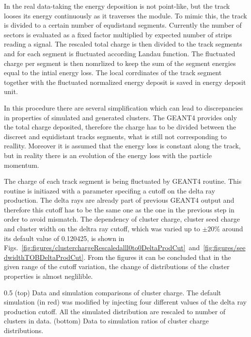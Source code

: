 In the real data-taking the energy deposition is not point-like, but the track looses its energy continuously as it traverses the module. To mimic this, the track is divided to a certain number of equdistand segments. Currently the number of sectors is evaluated as a fixed factor multiplied by expected number of strips reading a signal. The rescaled total charge is then divided to the track segments and for each segment is fluctuated according Landau function. The fluctuated charge per segment is then nomrlized to keep the sum of the segment energies equal to the intial energy loss. The local corrdinates of the track segment together with the fluctuated normalized energy deposit is saved in energy deposit unit.

In this procedure there are several simplification which can lead to discrepancies in properties of simulated and generated clusters. The GEANT4 provides only the total charge deposited, therefore the charge has to be divided between the discreet and equidistant tracks segments, what is still not corresponding to reallity. Moreover it is assumed that the energy loss is constant along the track, but in reality there is an evolution of the energy loss with the particle momentum.

The charge of each track segment is being fluctuated by GEANT4 routine. This routine is initiazed with a parameter specifing a cutoff on the delta ray production. The delta rays are already part of previous GEANT4 output and therefore this cutoff has to be the same one as the one in the previous step in order to avoid mismatch. The dependency of cluster charge, cluster seed charge and cluster width on the deltra ray cutoff, which was varied up to $\pm 20\%$ around its default value of 0.120425, is shown in Figs.~\ref{fig:figures/clusterchargeRescaledalll0to0DeltaProdCut}~and~\ref{fig:figures/seedwidthTOBDeltaProdCut}. From the figures it can be concluded that in the given range of the cutoff variation, the change of distributions of the cluster properties is almost neglilible. 

                 {0.5}       %
                 { (top) Data and simulation comparisons of cluster charge. The default simulation (in red) was modified by injecting four different values of the delta ray production cutoff. All the simulated distribution are rescaled to number of clusters in data. (bottom) Data to simulation ratios of cluster charge distributions. }

